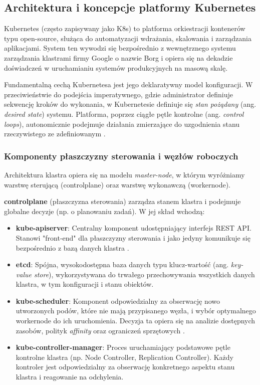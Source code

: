 \subsection{Architektura i koncepcje platformy Kubernetes}

Kubernetes (często zapisywany jako K8s) to platforma orkiestracji kontenerów typu open-source, 
służąca do automatyzacji wdrażania, skalowania i zarządzania aplikacjami. System ten wywodzi się 
bezpośrednio z wewnętrznego systemu zarządzania klastrami firmy Google o nazwie Borg 
\cite{verma2015large} i opiera się na dekadzie doświadczeń w uruchamianiu systemów produkcyjnych 
na masową skalę.

Fundamentalną cechą Kubernetesa jest jego deklaratywny model konfiguracji. W przeciwieństwie do 
podejścia imperatywnego, gdzie administrator definiuje sekwencję kroków do wykonania, w 
Kubernetesie definiuje się \textit{stan pożądany} (ang. \textit{desired state}) systemu. Platforma, 
poprzez ciągłe pętle kontrolne (ang. \textit{control loops}), autonomicznie podejmuje działania 
zmierzające do uzgodnienia stanu rzeczywistego ze zdefiniowanym \cite{burns2019kubernetes}.

\subsubsection{Komponenty płaszczyzny sterowania i węzłów roboczych}

Architektura klastra opiera się na modelu \textit{master-node}, w którym wyróżniamy warstwę sterującą 
(\gls{controlplane}) oraz warstwę wykonawczą (\gls{workernode}).

\textbf{\Gls{controlplane}} (płaszczyzna sterowania) zarządza stanem klastra i podejmuje globalne 
decyzje (np. o planowaniu zadań). W jej skład wchodzą:
\begin{itemize}
    \item \textbf{kube-apiserver}: Centralny komponent udostępniający interfejs REST API. Stanowi 
      "front-end" dla płaszczyzny sterowania i jako jedyny komunikuje się bezpośrednio z bazą 
      danych klastra \cite{kubernetes_docs}.
    \item \textbf{etcd}: Spójna, wysokodostępna baza danych typu klucz-wartość (ang. \textit{key-value store}), 
      wykorzystywana do trwałego przechowywania wszystkich danych klastra, w tym konfiguracji i stanu 
      obiektów.
    \item \textbf{kube-scheduler}: Komponent odpowiedzialny za obserwację nowo utworzonych podów, 
      które nie mają przypisanego węzła, i wybór optymalnego \gls{workernode} do ich uruchomienia. 
      Decyzja ta opiera się na analizie dostępnych zasobów, polityk \textit{affinity} oraz ograniczeń 
      sprzętowych \cite{k8s_scheduling}.
    \item \textbf{kube-controller-manager}: Proces uruchamiający podstawowe pętle kontrolne klastra 
      (np. Node Controller, Replication Controller). Każdy kontroler jest odpowiedzialny za obserwację 
      konkretnego aspektu stanu klastra i reagowanie na odchylenia.
\end{itemize}

